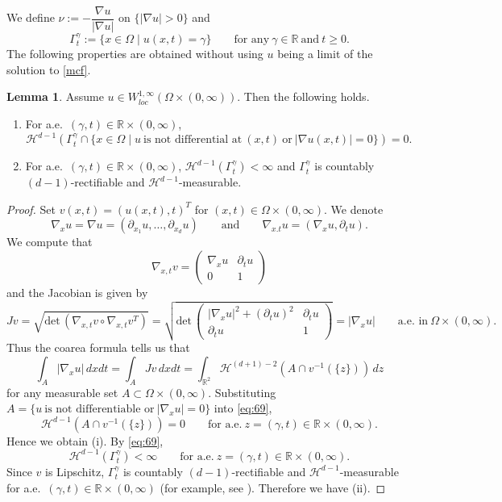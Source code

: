 \documentclass{amsart}
\theoremstyle{definition}
\newtheorem{lemma}[definition]{Lemma}
\def\R{{\mathbb{R}}}
\begin{document}
We define $\nu:=- \dfrac{\nabla u}{|\nabla u|}$ on $\{ |\nabla u|>0 \}$
and 
\[
\Gamma_t ^\gamma := \{ x\in \Omega \mid u(x,t)=\gamma \} \qquad
\text{for any} \ \gamma \in \R \ \text{and} \ t \geq 0.
\]
The following properties are obtained without using $u$ being a limit of the solution to \eqref{mcf}.
\begin{lemma}\label{lem:3.6}
Assume $u \in W^{1,\infty} _{loc} (\Omega \times (0,\infty))$. Then the following holds.
\begin{enumerate}
\item[(i)] For a.e.\ $(\gamma,t) \in \R \times (0,\infty)$, 
\begin{equation}\label{eq:68}
\mathcal{H}^{d-1} (\Gamma _t ^\gamma \cap \{ x \in \Omega \mid u \ \text{is not differential at} \ (x,t) \ \text{or} \ |\nabla u (x,t)|=0\}) =0.
\end{equation}
\item[(ii)] For a.e.\ $(\gamma,t) \in \R \times (0,\infty)$, $\mathcal{H}^{d-1} (\Gamma _t ^\gamma) <\infty$ and $\Gamma _t ^\gamma$ is countably $(d-1)$-rectifiable and $\mathcal{H}^{d-1}$-measurable.
\end{enumerate}
\end{lemma}
\begin{proof}
Set
$v (x,t) = (u(x,t),t)^T$
 for $(x,t) \in \Omega \times (0,\infty)$. We denote
\[
\nabla_x u = \nabla u = (\partial _{x_1} u ,\dots, \partial_{x_d} u)
\qquad 
\text{and}
\qquad
\nabla_{x.t} u =(\nabla_x u , \partial_{t} u).
\]
We compute that
\[
\nabla_{x,t} v
=
\begin{pmatrix}
\nabla_{x} u & \partial_t u \\
0 & 1
\end{pmatrix}
\]
and the Jacobian is given by
\[
Jv=\sqrt{\text{det} \, (\nabla_{x,t} v \circ \nabla_{x,t} v ^T) }
=
\sqrt{\text{det} \, 
\begin{pmatrix}
|\nabla _x u| ^2 +(\partial _t u)^2 & \partial_t u \\
\partial _t u & 1 
\end{pmatrix}
}
=|\nabla _x u| \qquad \text{a.e.\ in} \ \Omega \times (0,\infty).
\]
Thus the coarea formula tells us that
\begin{equation}\label{eq:69}
\int_A |\nabla _x u| \, dxdt
=
\int_A Jv \, dxdt
= \int_{\R^2} \mathcal{H}^{(d+1)-2}
(A \cap v^{-1} (\{z\})) \, dz    
\end{equation}
for any measurable set $A \subset \Omega \times (0,\infty)$.
Substituting $A=\{ u \ \text{is not differentiable or} \ |\nabla_x u|=0 \}$ into \eqref{eq:69}, 
\[
\mathcal{H}^{d-1} (A \cap v^{-1} (\{ z \}))=0
\qquad \text{for a.e.} \ z =(\gamma ,t) \in \R\times (0,\infty).
\]
Hence we obtain (i). By \eqref{eq:69}, 
\[
\mathcal{H}^{d-1} (\Gamma _t ^\gamma) <\infty
\qquad \text{for a.e.} \ z =(\gamma ,t) \in \R\times (0,\infty).
\]
Since $v$ is Lipschitz, $\Gamma_t ^\gamma$ is countably $(d-1)$-rectifiable and $\mathcal{H}^{d-1}$-measurable for a.e.\ $(\gamma,t) \in \R\times (0,\infty)$ (for example, see \cite[Theorem 2.93]{MR1857292}).
Therefore we have (ii).
\end{proof}
\end{document}

